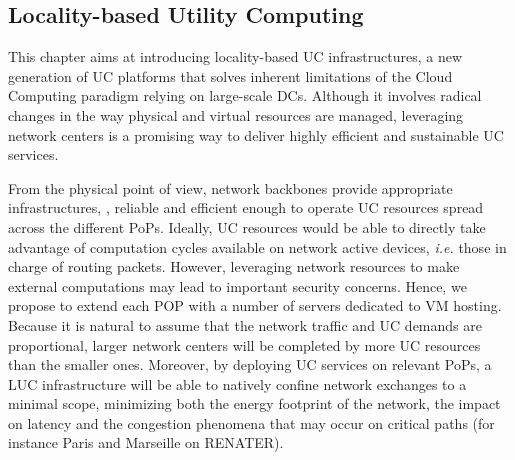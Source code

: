\subsection{Locality-based Utility Computing}



This chapter aims at introducing locality-based UC infrastructures, a new
generation of UC platforms that solves inherent limitations of the Cloud Computing 
paradigm relying on large-scale DCs. Although it involves radical changes in
the way physical and virtual resources are managed,  leveraging network centers
is a promising way to deliver highly efficient and sustainable UC services. 

From the physical point of view, network backbones 
provide appropriate infrastructures, \ie, reliable and efficient enough to operate UC
resources spread across the different PoPs. Ideally, UC resources would be able to
directly
take advantage of computation cycles available on network active devices, \textit{i.e.} those
in charge of routing packets. However, leveraging network resources to make external
computations may lead to important security concerns. Hence, we propose to extend each
POP with a number of servers dedicated to VM hosting.
Because it is natural to assume that the network traffic and UC demands are proportional, larger network
centers will be completed by more UC resources than the smaller ones. Moreover, by deploying
UC services on relevant PoPs, a LUC infrastructure will be able to natively confine
network exchanges to a minimal scope, minimizing both the energy footprint of the network, 
the impact on latency and the congestion phenomena that may occur on critical paths (for instance Paris and Marseille on RENATER). 

